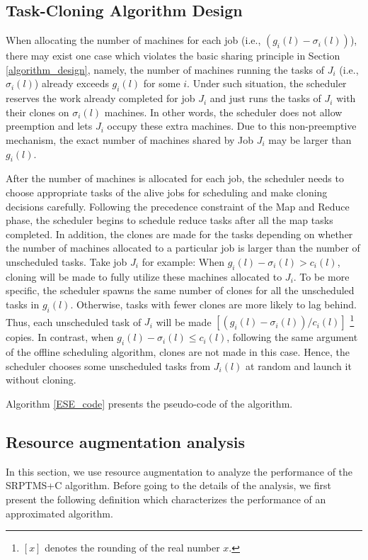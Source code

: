 \documentclass[10pt,conference,compsocconf,letterpaper]{IEEEtran}
\begin{document}
 \subsection{Task-Cloning Algorithm Design}
When allocating the number of machines for each job (i.e., $(g_i(l) - \sigma_i(l))$), there may exist one case which violates the basic sharing principle in
Section \ref{algorithm_design}, namely, the number of machines running the tasks of $J_i$ (i.e., $\sigma_i(l)$) already exceeds $g_i(l)$ for some $i$.
Under such situation, the scheduler reserves the work already completed for job $J_i$ and just runs the tasks of $J_i$ with their clones on $\sigma_i(l)$ machines. 
In other words,
the scheduler does not allow preemption and lets $J_i$ occupy these extra machines.
Due to this non-preemptive mechanism, the exact number of machines shared by Job $J_i$ may be larger than $g_i(l)$.

After the number of machines is allocated for each job, the scheduler needs to choose appropriate tasks of the alive jobs for scheduling and make cloning decisions carefully. Following the precedence  constraint of the Map and Reduce phase, the scheduler begins to schedule reduce tasks after all the map tasks completed. In addition, the clones are made for the tasks depending on whether the number of machines allocated to a particular job is larger than the number of unscheduled tasks.  Take job $J_i$ for example: When $g_i(l) - \sigma_i(l) > c_i(l)$, cloning will be made to fully utilize these machines allocated  to $J_i$. To be more specific, the scheduler spawns the same number of clones for all the unscheduled tasks in $g_i(l)$. Otherwise, tasks with fewer clones are more likely to lag behind. Thus, each unscheduled task of $J_i$ will be made $[(g_i(l) - \sigma_i(l))/c_i(l)]$ \footnote{$[x]$ denotes the rounding of the real number $x$.} copies. 
In contrast, when $g_i(l) - \sigma_i(l) \leq c_i(l)$, following the same argument of the offline scheduling algorithm, clones are not made in this case. Hence, the scheduler chooses some unscheduled tasks from $J_i(l)$ at random and launch it without cloning.  

Algorithm \ref{ESE_code} presents the pseudo-code of the algorithm.


\subsection{Resource augmentation analysis}
In this section, we use resource augmentation to analyze the performance of the SRPTMS+C algorithm.
Before going to the details of the analysis,
we first present the following definition which characterizes the performance of an approximated algorithm.
\end{document}
